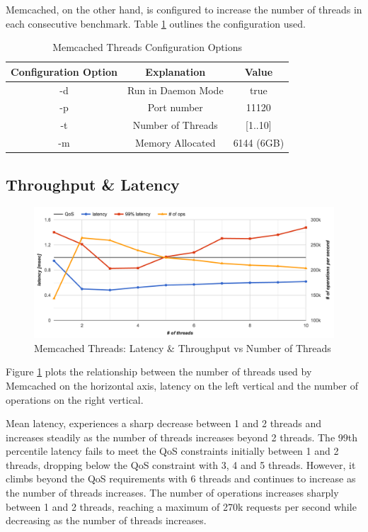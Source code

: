 Memcached, on the other hand, is configured to increase the number of threads in each consecutive benchmark. Table \ref{tab:m_threads_memcached} outlines the configuration used.

\begin{table}[h!]
\centering
\begin{tabular}{| c c c |}
 \hline
 Configuration Option & Explanation & Value\\ [0.5ex]
 \hline\hline

 -d & Run in Daemon Mode & true \\
 -p & Port number & 11120 \\
 -t & Number of Threads & [1..10] \\
 -m & Memory Allocated & 6144 (6GB) \\

 \hline

\end{tabular}
\caption{Memcached Threads Configuration Options}
\label{tab:m_threads_memcached}
\end{table}


\subsection{Throughput \& Latency}

\begin{figure}[h]
    \includegraphics[width=\textwidth]{./res2/m_threads_latency.png}
    \caption{Memcached Threads: Latency \& Throughput vs Number of Threads}
    \label{fig:m_threads_latency.png}
\end{figure}


Figure \ref{fig:m_threads_latency.png} plots the relationship between the number of threads used by Memcached on the horizontal axis, latency on the left vertical and the number of operations on the right vertical.

Mean latency, experiences a sharp decrease between 1 and 2 threads and increases steadily as the number of threads increases beyond 2 threads.
The 99th percentile latency fails to meet the QoS constraints initially between 1 and 2 threads, dropping below the QoS constraint with 3, 4 and 5 threads. However, it climbs beyond the QoS requirements with 6 threads and continues to increase as the number of threads increases.
The number of operations increases sharply between 1 and 2 threads, reaching a maximum of 270k requests per second while decreasing as the number of threads increases.

